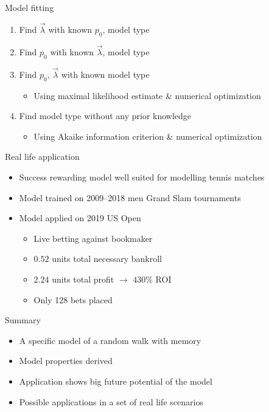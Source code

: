 \documentclass[american]{beamer}
\begin{document}
    \begin{frame}{Model fitting}
        \begin{enumerate}
            \item Find $\overrightarrow{\lambda}$ with known $p_{0}$, model type
            \item Find $p_{0}$ with known $\overrightarrow{\lambda}$, model type
            \item Find $p_{0},\,\overrightarrow{\lambda}$ with known model type
            \begin{itemize}
                \item Using maximal likelihood estimate \& numerical optimization
            \end{itemize}
            \item Find model type without any prior knowledge
            \begin{itemize}
                \item Using Akaike information criterion \& numerical optimization
            \end{itemize}
        \end{enumerate}
    \end{frame}

    \begin{frame}{Real life application}
        \begin{itemize}
            \item Success rewarding model well suited for modelling tennis matches
            \item Model trained on 2009--2018 men Grand Slam tournaments
            \item<2-> Model applied on 2019 US Open
            \begin{itemize}
                \item<2-> Live betting against bookmaker
                \item<2-> $0.52$ units total necessary bankroll
                \item<2-> $2.24$ units total profit $\rightarrow$ $430\%$ ROI
                \item<3-> Only 128 bets placed
            \end{itemize}
        \end{itemize}
    \end{frame}

    \begin{frame}{Summary}
        \begin{itemize}
            \item A specific model of a random walk with memory
            \item Model properties derived
            \item Application shows big future potential of the model
            \item Possible applications in a set of real life scenarios
        \end{itemize}
    \end{frame}
\end{document}
